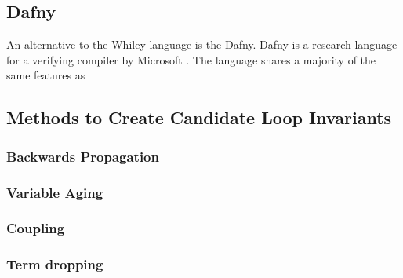 \subsection{Dafny}

An alternative to the Whiley language is the Dafny.
Dafny is a research language for a verifying compiler by Microsoft
\cite{dafny-lang}.
The language shares a majority of the same features as 

\cite{dafny-started}
\cite{dafny-lang}

\subsection{Methods to Create Candidate Loop Invariants}

\subsubsection{Backwards Propagation}

\subsubsection{Variable Aging}

\subsubsection{Coupling}

\subsubsection{Term dropping}

